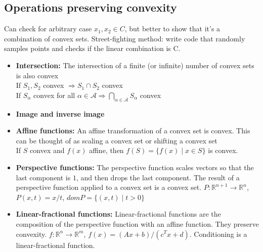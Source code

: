 \documentclass{article}
\begin{document}
\subsection{Operations preserving convexity}
Can check for arbitrary case $x_1, x_2 \in C$, but better to show that it's a combination of convex sets. Street-fighting method: write code that randomly samples points and checks if the linear combination is C.
\begin{itemize}
  \item \textbf{Intersection:} The intersection of a finite (or infinite) number of convex sets is also convex\\
  If $S_1, S_2$ convex $\Longrightarrow S_1 \cap S_2$ convex\\
  If $S_\alpha$ convex for all $\alpha \in \mathcal{A} \Longrightarrow \bigcap_{\alpha \in \mathcal{A}} S_\alpha$ convex\\
  \item \textbf{Image and inverse image}
  \item \textbf{Affine functions:} An affine transformation of a convex set is convex. This can be thought of as scaling a convex set or shifting a convex set\\
  If $S$ convex and $f(x)$ affine, then $f(S) = \{f(x) \mid x \in S\}$ is convex. 
  \item \textbf{Perspective functions:} The perspective function scales vectors so that the last component is $1$, and then drops the last component. The result of a perspective function applied to a convex set is a convex set. $P: \mathbb{R}^{n+1} \rightarrow \mathbb{R}^n$, $P(x, t) = x/t$, $domP = \{(x,t) \mid t>0\}$
  \item \textbf{Linear-fractional functions:} Linear-fractional functions are the composition of the perspective function with an affine function. They preserve convexity. $f: \mathbb{R}^n \rightarrow \mathbb{R}^m$, $f(x) = (Ax+b) / (c^Tx + d)$. Conditioning is a linear-fractional function.
\end{itemize}
\end{document}
